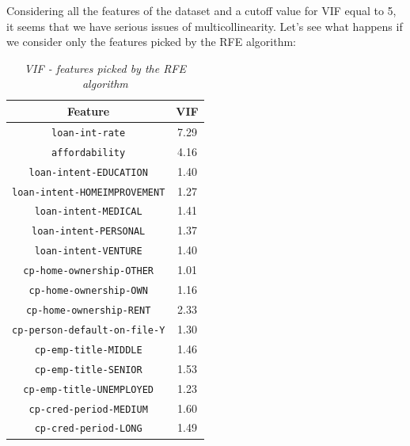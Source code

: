 \documentclass[a4paper,12pt]{article}
\begin{document}
            Considering all the features of the dataset and a cutoff value for VIF equal to 5, it seems
            that we have serious issues of multicollinearity. Let's see what happens if we consider only
            the features picked by the RFE algorithm:

            \begin{table}[H]
                \centering
                    \begin{tabular}{|c | c|} 
                        \hline
                            Feature & VIF \\ [0.5ex] 
                            \hline\hline
                            \texttt{loan-int-rate} & 7.29 \\
                            \texttt{affordability} & 4.16 \\
                            \texttt{loan-intent-EDUCATION} & 1.40 \\
                            \texttt{loan-intent-HOMEIMPROVEMENT} & 1.27 \\
                            \texttt{loan-intent-MEDICAL} & 1.41 \\
                            \texttt{loan-intent-PERSONAL} & 1.37 \\
                            \texttt{loan-intent-VENTURE} & 1.40 \\
                            \texttt{cp-home-ownership-OTHER} & 1.01 \\
                            \texttt{cp-home-ownership-OWN} & 1.16 \\
                            \texttt{cp-home-ownership-RENT} & 2.33 \\
                            \texttt{cp-person-default-on-file-Y} & 1.30 \\
                            \texttt{cp-emp-title-MIDDLE} & 1.46 \\
                            \texttt{cp-emp-title-SENIOR} & 1.53 \\
                            \texttt{cp-emp-title-UNEMPLOYED} & 1.23 \\
                            \texttt{cp-cred-period-MEDIUM} & 1.60 \\
                            \texttt{cp-cred-period-LONG} & 1.49 \\ [1ex]
                        \hline
                    \end{tabular}
                    \caption{\textit{VIF - features picked by the RFE algorithm}}
                    \label{table:VIF_RFE}
            \end{table}
\end{document}
